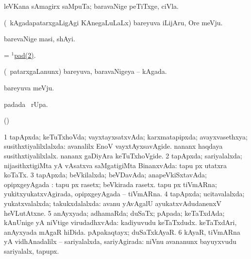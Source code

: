 \bentry
{} 
\gl{\nA}
\expl{}
\bmng
leVKana sAmagirx saMpuTa; baravaNige peTiTxge, ciVla. 
\emng
\eentry

\bentry
{} 
\gl{\nA}
\expl{}
\bmng
(\kanmu\ kAgadapatarxgaLigAgi KAnegaLuLaLx) bareyuva iLijAru, Ore meVju. 
\emng
\eentry

\bentry
{} 
\gl{\nA}
\expl{}
\bmng
barevaNige masi, shAyi. 
\emng
\eentry

\bentry
{} 
\gl{\nA}
\expl{}
\bmng
= \hyperref{kandict_p.pdf}{P}{pad(1)2}{$^1$pad(2)}. 
\emng
\eentry

\bentry
{} 
\gl{\nA}
\expl{}
\bmng
(\kanmu\ patarxgaLanunx) bareyuva, baravaNigeya -- kAgada. 
\emng
\eentry

\bentry
{} 
\gl{\nA}
\expl{}
\bmng
bareyuva meVju. 
\emng
\eentry

\bentry
{} 
\gl{\kirx}
\expl{}
\bmng
{} padada \BUkaq\ rUpa. 
\emng
\eentry

\bentry
{} 
\gl{\saMkiSx}
\expl{}
\bmng
(\UK)  
\emng
\eentry

\bentry
{} 
\gl{\gu}
\expl{}
\bmng
\bnum
\num{1} tapApxda; keTuTxhoVda; vayxtayxsatxvAda; karxmatapipxda; avayxvasethxya; susithxtiyalilxlalxda:  avanalilx EnoV vayxtAyxsavAgide.  nananx haqdaya susithxtiyalilxlalx.  nananx gaDiyAra keTuTxhoVgide. 
\num{2} tapApxda; sariyalalxda; nijasithxtigiMta yA vAsatxva saMgatigiMta BinanxvAda:  tapu px utatxra koTaTx. 
\num{3} tapApxda; beVkilalxda; beVDavAda; anapeVkiSxtavAda; opipxgeyAgada :  tapu px rasetx; beVkirada rasetx.  tapu px tiVmARna; yukitxyukatxvAgirada, opipxgeyAgada -- tiVmARna. 
\num{4} tapApxda; ucitavalalxda; yukatxvalalxda; takukxdalalxda:  avanu yAvAgalU ayukatxvAdudanenxV heVLutAtxne. 
\num{5} anAyxyada; adhamaRda; duSaTx; pApada; keTaTxdAda; kAnUnige yA niVtige virudadhxvAda:  kadiyuvudu keTaTxdudx.  keTaTxdAri, anAyxyada mAgaR hiDida.  pApakaqtayx; duSaTxkAyaR. 
\num{6} kAyaR, tiVmARna yA vidhAnadalilx -- sariyalalxda, sariyAgirada:  niVnu avananunx bayuyxvudu sariyalalx, tapupx. 
\enum
\emng

